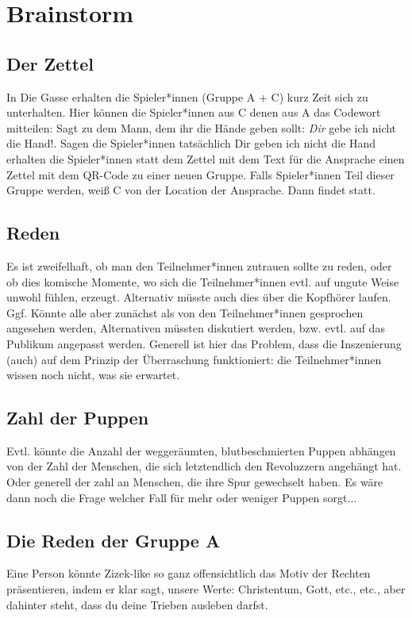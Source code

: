 \documentclass[a4paper, 12pt]{report}
\begin{document}
\section*{Brainstorm}

\subsection*{Der Zettel}
In \glqq Die Gasse\grqq{} erhalten die Spieler*innen (Gruppe A + C) kurz Zeit sich zu unterhalten.
Hier können die Spieler*innen aus C denen aus A das Codewort mitteilen:
\glqq Sagt zu dem Mann, dem ihr die Hände geben sollt: \glq \textit{Dir} gebe ich nicht die Hand!\grq\grqq.
Sagen die Spieler*innen tatsächlich \glqq Dir geben ich nicht die Hand\grqq{} erhalten die Spieler*innen statt dem Zettel mit dem Text für die Ansprache einen Zettel mit dem QR-Code zu einer neuen Gruppe.
Falls Spieler*innen Teil dieser Gruppe werden, weiß C von der Location der Ansprache.
Dann findet  statt.

\subsection*{Reden}
Es ist zweifelhaft, ob man den Teilnehmer*innen zutrauen sollte zu reden, oder ob dies komische Momente, wo sich die Teilnehmer*innen evtl. auf ungute Weise unwohl fühlen, erzeugt.
Alternativ müsste auch dies über die Kopfhörer laufen. 
Ggf. Könnte alle aber zunächst als von den Teilnehmer*innen gesprochen angesehen werden, Alternativen müssten diskutiert werden, bzw. evtl. auf das Publikum angepasst werden. 
Generell ist hier das Problem, dass die Inszenierung (auch) auf dem Prinzip der Überraschung funktioniert: 
die Teilnehmer*innen wissen noch nicht, was sie erwartet.

\subsection*{Zahl der Puppen}\label{zahl_der_puppen}
Evtl. könnte die Anzahl der weggeräumten, blutbeschmierten Puppen abhängen von der Zahl der Menschen, die sich letztendlich den Revoluzzern angehängt hat. 
Oder generell der zahl an Menschen, die ihre Spur gewechselt haben.
Es wäre dann noch die Frage welcher Fall für mehr oder weniger Puppen sorgt...

\subsection*{Die Reden der Gruppe A}
Eine Person könnte Zizek-like so ganz offensichtlich das Motiv der Rechten präsentieren, indem er klar sagt, unsere Werte: 
Christentum, Gott, etc., etc., aber dahinter steht, dass du deine Trieben ausleben darfst.
\end{document}
